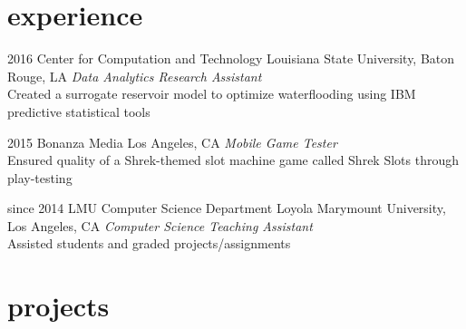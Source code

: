 \documentclass[]{friggeri-cv} %
\begin{document}
\section{experience}

  \begin{entrylist}


    \entry
      {2016}
      {Center for Computation and Technology}
      {Louisiana State University, Baton Rouge, LA}
      {\emph{Data Analytics Research Assistant} \\
	Created a surrogate reservoir model to optimize waterflooding using IBM predictive statistical tools}
	  

    \entry
      {2015}
      {Bonanza Media}
      {Los Angeles, CA}
      {\emph{Mobile Game Tester} \\
	Ensured quality of a Shrek-themed slot machine game called Shrek Slots through play-testing}


    \entry
      {since 2014}
      {LMU Computer Science Department}
      {Loyola Marymount University, Los Angeles, CA}
      {\emph{Computer Science Teaching Assistant} \\
        Assisted students and graded projects/assignments}


\end{entrylist}


\section{projects}
\end{document}
